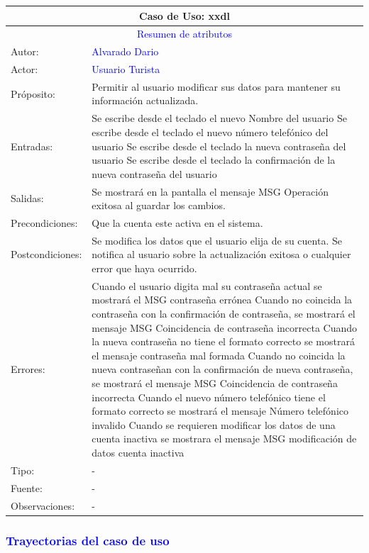 \begin{tabularx}{16cm}{||l|X||}
	\hline
	\multicolumn{2}{||c||}{Caso de Uso: xxdl} \\
	\hline
	\multicolumn{2}{||c||}{\textcolor{blue}{Resumen de atributos}} \\
 \hline
	{Autor:} & {\textcolor{blue}{Alvarado Dario}} \\
	\hline
	\hline
	{Actor:} & {\textcolor{blue}{Usuario Turista}} \\
	\hline
	{Próposito:} & Permitir al usuario modificar sus datos para mantener su información actualizada.\\
	\hline
	{Entradas:} & {Se escribe desde el teclado el nuevo Nombre del usuario
 Se escribe desde el teclado el nuevo número telefónico del usuario
 Se escribe desde el teclado la nueva contraseña del usuario
 Se escribe desde el teclado la confirmación de la nueva contraseña del usuario
}
        \\
	\hline
	{Salidas:} & {Se mostrará en la pantalla el mensaje MSG Operación exitosa al guardar los cambios.}\\
	\hline
	{Precondiciones:} & {Que la cuenta este activa en el sistema.}\\
    \hline
	{Postcondiciones:} & {Se modifica los datos que el usuario elija de su cuenta.
 Se notifica al usuario sobre la actualización exitosa o cualquier error que haya ocurrido.}\\
	\hline
	{Errores:} & {Cuando el usuario digita mal su contraseña actual se mostrará el MSG contraseña errónea
 Cuando no coincida la contraseña con la confirmación de contraseña, se mostrará el mensaje MSG Coincidencia de contraseña incorrecta
 Cuando la nueva contraseña no tiene el formato correcto se mostrará el mensaje contraseña mal formada
 Cuando no coincida la nueva contraseñan con la confirmación de nueva contraseña, se mostrará el mensaje MSG Coincidencia de contraseña incorrecta
 Cuando el nuevo número telefónico tiene el formato correcto se mostrará el mensaje Número telefónico invalido
 Cuando se requieren modificar los datos de una cuenta inactiva se mostrara el mensaje MSG modificación de datos cuenta inactiva} \\
	\hline
	{Tipo:} & {-}\\
	\hline
	{Fuente:} & {-} \\
	\hline
	{Observaciones:} & {-} \\
	\hline
\end{tabularx}

\subsubsection{\textcolor{blue}{Trayectorias del caso de uso}}

